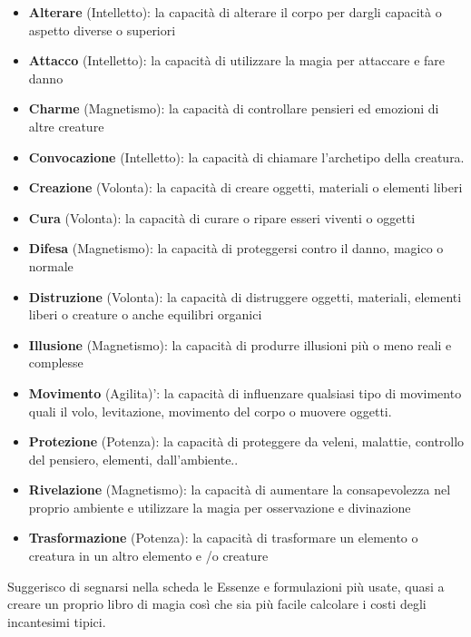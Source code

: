 \documentclass[a4paper,10 pt,twoside,openany]{book}
\begin{document}
\begin{itemize}

	\item
	\textbf{Alterare} (Intelletto): la capacità di alterare il corpo per dargli capacità o aspetto diverse o superiori
	\item
	\textbf{Attacco} (Intelletto): la capacità di utilizzare la magia per attaccare e fare danno
	\item
	\textbf{Charme} (Magnetismo): la capacità di controllare pensieri
	ed emozioni di altre creature
	\item
	\textbf{Convocazione} (Intelletto): la capacità di chiamare l'archetipo
	della creatura.
	\item
	\textbf{Creazione} (Volonta): la capacità di creare oggetti, materiali o elementi liberi
	\item
	\textbf{Cura} (Volonta): la capacità di curare o ripare esseri viventi o oggetti
	\item
	\textbf{Difesa} (Magnetismo): la capacità di proteggersi contro il danno, magico o normale
	\item
	\textbf{Distruzione} (Volonta): la capacità di distruggere oggetti, materiali, elementi liberi o creature o anche equilibri organici
	\item
	\textbf{Illusione} (Magnetismo): la capacità di produrre illusioni più o meno reali e complesse
	\item
	\textbf{Movimento} (Agilita)': la capacità di influenzare qualsiasi tipo di movimento quali il volo, levitazione, movimento del corpo o muovere oggetti.
	\item
	\textbf{Protezione} (Potenza): la capacità di proteggere da veleni, malattie, controllo del pensiero, elementi, dall'ambiente..
	\item
	\textbf{Rivelazione} (Magnetismo): la capacità di aumentare la consapevolezza nel proprio ambiente e utilizzare la magia per osservazione e divinazione
	\item
	\textbf{Trasformazione} (Potenza): la capacità di trasformare un elemento o creatura in un altro elemento e /o creature

\end{itemize}

\bigskip

Suggerisco di segnarsi nella scheda le Essenze e formulazioni più usate, quasi a creare un proprio libro di magia così che sia più facile calcolare i costi degli incantesimi tipici.
\end{document}
